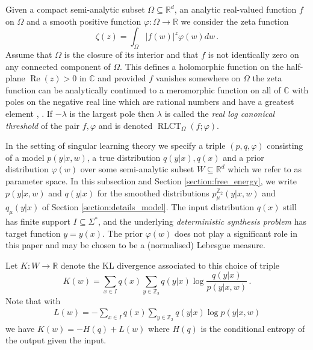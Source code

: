 \documentclass[english,letter paper,12pt,reqno]{article}
\theoremstyle{definition}
\def\be{\begin{equation}}
\def\ee{\end{equation}}
\newcommand{\lto}{\longrightarrow}
\newcommand{\bb}[1]{\mathbb{#1}}
\begin{document}
Given a compact semi-analytic subset $\Omega \subseteq \mathbb{R}^d$, an analytic real-valued function $f$ on $\Omega$ and a smooth positive function $\varphi: \Omega \lto \mathbb{R}$ we consider the zeta function
\be\label{eq:zeta_function}
\zeta(z) = \int_{\Omega} |f(w)|^z \varphi(w) dw\,.
\ee
Assume that $\Omega$ is the closure of its interior and that $f$ is not identically zero on any connected component of $\Omega$. This defines a holomorphic function on the half-plane $\operatorname{Re}(z) > 0$ in $\mathbb{C}$ and provided $f$ vanishes somewhere on $\Omega$ the zeta function can be analytically continued to a meromorphic function on all of $\mathbb{C}$ with poles on the negative real line which are rational numbers and have a greatest element \cite[\S 4.5]{watanabeAlgebraicGeometryStatistical2009}, \cite[Corollary 3.10]{lin2011algebraic}. If $-\lambda$ is the largest pole then $\lambda$ is called the \emph{real log canonical threshold} of the pair $f, \varphi$ and is denoted $\operatorname{RLCT}_{\Omega}(f ; \varphi)$.

In the setting of singular learning theory \cite{watanabeAlgebraicGeometryStatistical2009} we specify a triple $(p, q, \varphi)$ consisting of a model $p(y|x,w)$, a true distribution $q(y|x), q(x)$ and a prior distribution $\varphi(w)$ over some semi-analytic subset $W \subseteq \mathbb{R}^d$ which we refer to as parameter space. In this subsection and Section \ref{section:free_energy}, we write $p(y|x,w)$ and $q(y|x)$ for the smoothed distributions $p^{\bb{Z}_2}_\mu(y|x,w)$ and $q_\mu(y|x)$ of Section \ref{section:details_model}. The input distribution $q(x)$ still has finite support $I \subseteq \Sigma^*$, and the underlying \emph{deterministic synthesis problem} \cite{clift2021geometry} has target function $y = y(x)$. The prior $\varphi(w)$ does not play a significant role in this paper and may be chosen to be a (normalised) Lebesgue measure.

Let $K: W \lto \mathbb{R}$ denote the KL divergence associated to this choice of triple
\be
K(w) = \sum_{x \in I} q(x) \sum_{y \in \bb{Z}_2} q(y|x) \log\frac{q(y|x)}{p(y|x,w)}\,.
\ee
Note that with
\begin{align*}
L(w) = -\sum_{x \in I} q(x) \sum_{y \in \bb{Z}_2} q(y|x) \log p(y|x,w)
\end{align*}
we have $K(w) = - H(q) + L(w)$ where $H(q)$ is the conditional entropy of the output given the input.
\end{document}
